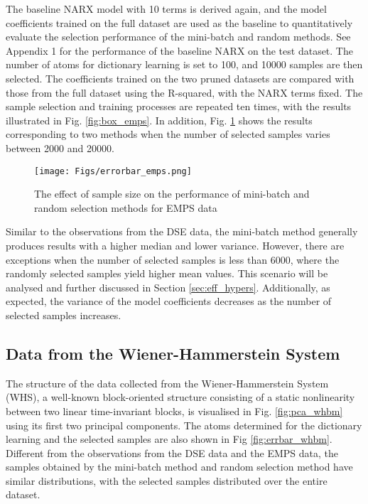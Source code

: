 \documentclass{article}
\begin{document}
The baseline NARX model with 10 terms is derived again, and the model coefficients trained on the full dataset are used as the baseline to quantitatively evaluate the selection performance of the mini-batch and random methods.
See Appendix 1 for the performance of the baseline NARX on the test dataset.
The number of atoms for dictionary learning is set to 100, and 10000 samples are then selected. 
The coefficients trained on the two pruned datasets are compared with those from the full dataset using the R-squared, with the NARX terms fixed.
The sample selection and training processes are repeated ten times, with the results illustrated in Fig. \ref{fig:box_emps}. 
In addition, Fig. \ref{fig:errbar_emps} shows the results corresponding to two methods when the number of selected samples varies between 2000 and 20000. 

\begin{figure}[htpb]
    \centering
    \texttt{[image: Figs/errorbar\_emps.png]}
    \caption{The effect of sample size on the performance of mini-batch and random selection methods for EMPS data}
    \label{fig:errbar_emps}
\end{figure}

Similar to the observations from the DSE data, the mini-batch method generally produces results with a higher median and lower variance. 
However, there are exceptions when the number of selected samples is less than 6000, where the randomly selected samples yield higher mean values. This scenario will be analysed and further discussed in Section \ref{sec:eff_hypers}.
Additionally, as expected, the variance of the model coefficients decreases as the number of selected samples increases. 

\subsection{Data from the Wiener-Hammerstein System}
The structure of the data collected from the Wiener-Hammerstein System (WHS), a well-known block-oriented structure consisting of a static nonlinearity between two linear time-invariant blocks, is visualised in Fig. \ref{fig:pca_whbm} using its first two principal components.
The atoms determined for the dictionary learning and the selected samples are also shown in Fig \ref{fig:errbar_whbm}.
Different from the observations from the DSE data and the EMPS data, the samples obtained by the mini-batch method and random selection method have similar distributions, with the selected samples distributed over the entire dataset.
\end{document}
